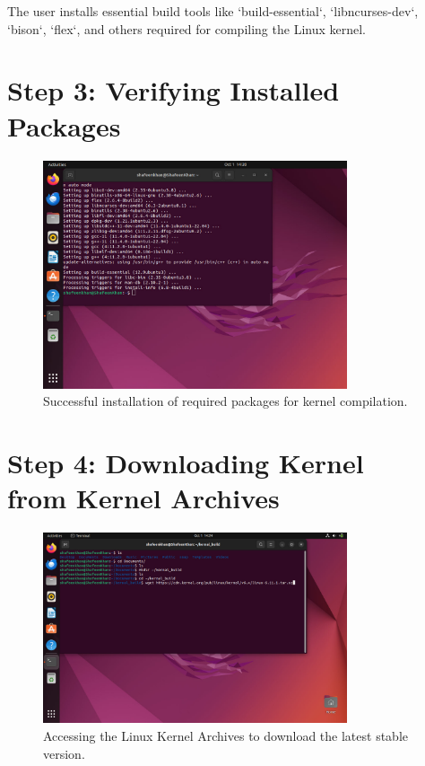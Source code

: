 \documentclass{article}
\begin{document}
The user installs essential build tools like `build-essential`, `libncurses-dev`, `bison`, `flex`, and others required for compiling the Linux kernel.

\section*{Step 3: Verifying Installed Packages}
\begin{figure}[H]
    \centering
    \includegraphics[width=0.8\textwidth]{75.jpg}
    \caption{Successful installation of required packages for kernel compilation.}
\end{figure}



\section*{Step 4: Downloading Kernel \\ from Kernel Archives}
\begin{figure}[H]
    \centering
    \includegraphics[width=0.8\textwidth]{73.jpg}
    \caption{Accessing the Linux Kernel Archives to download the latest stable version.}
\end{figure}
\end{document}
